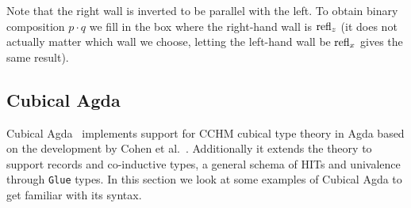 Note that the right wall is inverted to be parallel with the left.
To obtain binary composition $p \cdot q$ we fill in the box where the right-hand
wall is $\operatorname{refl}_z$ (it does not actually matter which wall we choose,
letting the left-hand wall be $\operatorname{refl}_x$ gives the same result).

\subsection{Cubical Agda}
Cubical Agda~\cite{vezzosi2021cubical} implements support for CCHM cubical type
theory in Agda based on the development by Cohen et al.~\cite{cohen2016cubical}.
Additionally it extends the theory to support records and co-inductive types, a
general schema of HITs and univalence through \texttt{Glue} types. In this
section we look at some examples of Cubical Agda to get familiar with its
syntax.

